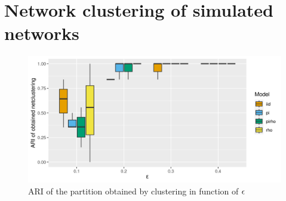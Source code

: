\section{Network clustering of simulated networks}\label{sec:network-clustering-of-simulated-networks}

\begin{figure}
\centering
\includegraphics{./img/99d363f6aa43bf0eba413cb994dc00b130709107.png}
\caption{\label{}ARI of the partition obtained by clustering in function
of \(\epsilon_{}\)}
\end{figure}
